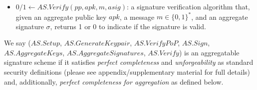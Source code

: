 \begin{definition}
\begin{itemize}
\item $0/1 \leftarrow \mathit{AS.Verify}(\mathit{pp}, \mathit{apk}, m, \mathit{asig})$:
a signature verification algorithm that,
given an aggregate public key $\mathit{apk}$, a message $m \in \{0, 1\}^*$, and an aggregate signature $\sigma$,
returns
1 or 0 to indicate if the signature is valid.
\end{itemize}

\noindent We say ($\mathit{AS.Setup}$, $\mathit{AS.GenerateKeypair}$, $\mathit{AS.VerifyPoP}$, 
$\mathit{AS.Sign}$, \\$\mathit{AS.AggregateKeys}$, $\mathit{AS.AggregateSignatures}$, 
$\mathit{AS.Verify}$) is an aggregatable signature scheme if it satisfies \emph{perfect completeness} and \emph{unforgeability} 
as standard security definitions (please see appendix/supplementary material for full details) and, 
additionally, \emph{perfect completeness for aggregation}  as defined below.
\end{definition}


